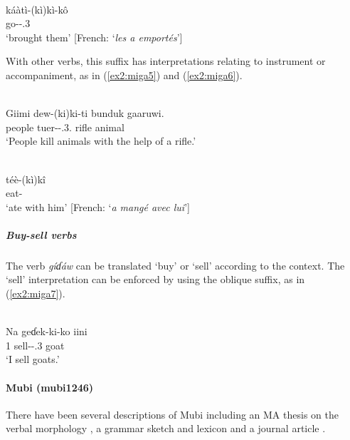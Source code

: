 \ex\label{ex2:miga4}
 \\
\gll káàtì-(kì)kì-kô \\
go--.3 \\
\glt `brought them' [French: `\textit{les a emportés}']
\z

With other verbs, this suffix has interpretations relating to instrument or accompaniment, as in (\ref{ex2:miga5}) and (\ref{ex2:miga6}).

\ea\label{ex2:miga5}
 \\
\gll Giimi dew-(ki)ki-ti bunduk gaaruwi. \\
people tuer--.3. rifle animal \\
\glt `People kill animals with the help of a rifle.' 

\ex\label{ex2:miga6}
 \\
\gll téè-(kì)kî \\
eat-\\
\glt `ate with him' [French: `\textit{a mangé avec lui}']
\z 

\subparagraph{Buy-sell verbs}

The verb \textit{gíɗáw} can be translated `buy' or `sell' according to the context. The `sell' interpretation can be enforced by using the oblique suffix, as in (\ref{ex2:miga7}).

\ea\label{ex2:miga7}
 \\
\gll Na  geɗek-ki-ko iini \\
1  sell--.3 goat \\
\glt `I sell goats.'
\z 

\paragraph*{Mubi (mubi1246)}

There have been several descriptions of Mubi including an MA thesis on the verbal morphology  \citep{prickettPhonologyMorphologyVerb2012}, a grammar sketch and lexicon \citep{jungraithmayrLangueMubiKaan2013} and a journal article \citep{peustProgressMubiStudies2014}. 

